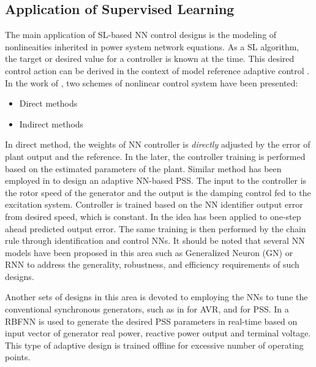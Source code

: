 \documentclass[journal]{IEEEtran}
\begin{document}
\subsection{Application of Supervised Learning}
The main application of SL-based NN control designs is the modeling of nonlineaities inherited in power system network equations. As a SL algorithm, the target or desired value for a controller is known at the time. This desired control action can be derived in the context of model reference adaptive control \cite{narendra1990identification}. In the work of \cite{narendra1990identification}, two schemes of nonlinear control system have been presented:
\begin{itemize} 
\item Direct methods
\item Indirect methods
\end{itemize}
In direct method, the weights of NN controller is \textit{directly} adjusted by the error of plant output and the reference. In the later, the controller training is performed based on the estimated parameters of the plant. Similar method has been employed in \cite{liu2003design} to design an adaptive NN-based PSS. The input to the controller is the rotor speed of the generator and the output is the damping control fed to the excitation system. Controller is trained based on the NN identifier output error from desired speed, which is constant. In \cite{chaturvedi2005generalized} the idea has been applied to one-step ahead predicted output error. The same training is then performed by the chain rule through identification and control NNs. It should be noted that several NN models have been proposed in this area such as Generalized Neuron (GN) \cite{chaturvedi2005generalized} or RNN \cite{he1997adaptive} to address the generality, robustness, and efficiency requirements of such designs.

Another sets of designs in this area is devoted to employing the NNs to tune the conventional synchronous generators, such as in \cite{swidenbank1999neural} for AVR, and \cite{segal2000radial} for PSS. In \cite{segal2000radial} a RBFNN is used to generate the desired PSS parameters in real-time based on input vector of  generator real power, reactive power output and terminal voltage. This type of adaptive design is trained offline for excessive number of operating points. 
\end{document}

